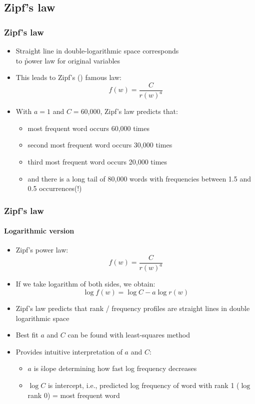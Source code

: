 \documentclass[t]{beamer} %
\begin{document}
\subsection{Zipf's law}

\begin{frame}
  \frametitle{Zipf's law}

\begin{itemize}
\item Straight line in double-logarithmic space corresponds\\
  to \h{power law} for original variables
\item This leads to Zipf's (\citeyear{Zipf:49,Zipf:65}) famous law:
    \[
    f(w)=\frac{C}{r(w)^a}
    \]
    \pause
  \item With $a=1$ and $C=$60,000, Zipf's law predicts that:
    \begin{itemize}
    \item most frequent word occurs 60,000 times
    \item second most frequent word occurs 30,000 times
    \item third most frequent word occurs 20,000 times
    \item and there is a long tail of 80,000 words with frequencies between
      1.5 and 0.5 occurrences(!)
    \end{itemize}
  \end{itemize}

\end{frame}

\begin{frame}
  \frametitle{Zipf's law}\framesubtitle{Logarithmic version}

  \begin{itemize}
  \item Zipf's power law:
    \[
    f(w)=\frac{C}{r(w)^a}
    \]
  \item If we take logarithm of both sides, we obtain:
    \[
    \log f(w)= \log C - a \log r(w)
    \]
  \item Zipf's law predicts that rank / frequency profiles are
    straight lines in double logarithmic space
  \item Best fit $a$ and $C$ can be found with least-squares
    method%
    \pause
  \item Provides intuitive interpretation of $a$ and $C$:
    \begin{itemize}
    \item $a$ is \h{slope} determining how fast log frequency decreases
    \item $\log C$ is \h{intercept}, i.e., predicted log frequency of word
      with rank 1 ($\log$ rank 0) = most frequent word
    \end{itemize}
  \end{itemize}
\end{frame}
\end{document}
